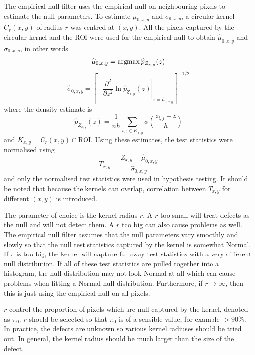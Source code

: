 The empirical null filter uses the empirical null on neighbouring pixels to estimate the null parameters. To estimate $\mu_{0,x,y}$ and $\sigma_{0,x,y}$, a circular kernel $C_r(x,y)$ of radius $r$ was centred at $(x,y)$. All the pixels captured by the circular kernel and the ROI were used for the empirical null to obtain $\widehat{\mu}_{0,x,y}$ and $\widehat{\sigma}_{0,x,y}$, in other words
\begin{equation}
  \widehat{\mu}_{0,x,y} = \operatorname*{argmax}\widehat{p}_{Z_{x,y}}(z)
\end{equation}
\begin{equation}
  \widehat{\sigma}_{0,x,y} = \left[
    \left.
      -\dfrac{\partial^2}{\partial z^2}\ln\widehat{p}_{Z_{x,y}}(z)
    \right|_{z=\widehat{\mu}_{0,x,y}}
  \right]^{-1/2}
\end{equation}
where the density estimate is
\begin{equation}
\widehat{p}_{Z_{x,y}}(z) = 
\frac{1}{nh}
  \sum_{i,j\in K_{x,y}}\phi\left(
    \dfrac{z_{i,j}-z}{h}
  \right)
\end{equation}
and $K_{x,y} = C_r(x,y) \cap \text{ROI}$. Using these estimates, the test statistics were normalised using
\begin{equation}
  T_{x,y} = 
  \dfrac{
    Z_{x,y}-\widehat{\mu}_{0,x,y}
  }
  {
    \widehat{\sigma}_{0,x,y}
  }
\end{equation}
and only the normalised test statistics were used in hypothesis testing. It should be noted that because the kernels can overlap, correlation between $T_{x,y}$ for different $(x,y)$ is introduced.

The parameter of choice is the kernel radius $r$. A $r$ too small will treat defects as the null and will not detect them. A $r$ too big can also cause problems as well. The empirical null filter assumes that the null parameters vary smoothly and slowly so that the null test statistics captured by the kernel is somewhat Normal. If $r$ is too big, the kernel will capture far away test statistics with a very different null distribution. If all of these test statistics are pulled together into a histogram, the null distribution may not look Normal at all which can cause problems when fitting a Normal null distribution. Furthermore, if $r\rightarrow \infty$, then this is just using the empirical null on all pixels.

$r$ control the proportion of pixels which are null captured by the kernel, denoted as $\pi_0$. $r$ should be selected so that $\pi_0$ is of a sensible value, for example $>90\%$. In practice, the defects are unknown so various kernel radiuses should be tried out. In general, the kernel radius should be much larger than the size of the defect.

